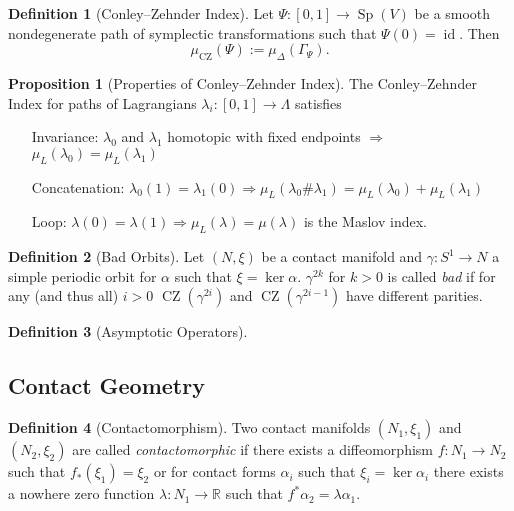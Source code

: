 \documentclass[a4paper]{article}
\newcommand{\RR}{\mathbb{R}}
\newcommand{\lra}{\longrightarrow}
\newcommand{\id}{\operatorname{id}}
\theoremstyle{definition}
\newtheorem{prop}{Proposition}
\theoremstyle{definition}
\newtheorem{definition}{Definition}
\theoremstyle{remark}
\theoremstyle{remark}
\theoremstyle{remark}
\begin{document}
\begin{definition}[Conley--Zehnder Index]
  Let $\Psi:[0,1]\lra\operatorname{Sp}(V)$ be a smooth nondegenerate path of symplectic transformations such that $\Psi(0)=\id$. Then
  \begin{equation*}
    \mu_{\text{CZ}}(\Psi):=\mu_{\Delta}(\Gamma_{\Psi}).
  \end{equation*}
\end{definition}

\begin{prop}[Properties of Conley--Zehnder Index]
  The Conley--Zehnder Index for paths of Lagrangians $\lambda_i:[0,1]\lra\Lambda$ satisfies
  \begin{itemize}
    \item[Invariance:] $\lambda_0$ and $\lambda_1$ homotopic with fixed endpoints $\Longrightarrow$ $\mu_L(\lambda_0)=\mu_L(\lambda_1)$
    \item[Concatenation:] $\lambda_0(1)=\lambda_1(0) \Longrightarrow \mu_L(\lambda_0\#\lambda_1)=\mu_L(\lambda_0)+\mu_L(\lambda_1)$
    \item[Loop:] $\lambda(0)=\lambda(1)\Longrightarrow \mu_L(\lambda)=\mu(\lambda)$ is the Maslov index.
  \end{itemize}
\end{prop}

\begin{definition}[Bad Orbits]
  Let $(N,\xi)$ be a contact manifold and $\gamma:S^1\lra N$ a simple periodic orbit for $\alpha$ such that $\xi=\ker\alpha$. $\gamma^{2k}$ for $k>0$ is called \emph{bad} if for any (and thus all) $i>0$ $\operatorname{CZ}(\gamma^{2i})$ and $\operatorname{CZ}(\gamma^{2i-1})$ have different parities.
\end{definition}

\begin{definition}[Asymptotic Operators]
  
\end{definition}

\subsection{Contact Geometry}

\begin{definition}[Contactomorphism]
  Two contact manifolds $(N_1,\xi_1)$ and $(N_2,\xi_2)$ are called \emph{contactomorphic} if there exists a diffeomorphism $f:N_1\lra N_2$ such that $f_*(\xi_1)=\xi_2$ or for contact forms $\alpha_i$ such that $\xi_i=\ker\alpha_i$ there exists a nowhere zero function $\lambda:N_1\lra\RR$ such that $f^*\alpha_2=\lambda\alpha_1$.
\end{definition}
\end{document}
